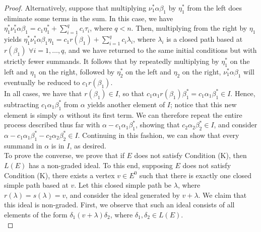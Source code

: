 \documentclass[12pt]{amsart}
\theoremstyle{plain} \numberwithin{equation}{section}
\theoremstyle{definition}
\theoremstyle{definition}
\begin{document}
\begin{proof}
Alternatively, suppose that multiplying $\nu_1^*\alpha\beta_1$ by $\eta_1^*$ from the left does eliminate some terms in the sum. In this case, we have $\eta_1^*\nu_1^*\alpha\beta_1 = c_1\eta_1^* + \sum_{i=1}^q c_i\tau_i$, where $q < n$. Then, multiplying from the right by $\eta_1$ yields $\eta_1^*\nu_1^*\alpha\beta_1\eta_1 = c_1r(\beta_1) + \sum_{i=1}^qc_i\lambda_i$, where $\lambda_i$ is a closed path based at $r(\beta_1)$ $\forall i = 1,\dots ,q$, and we have returned to the same initial conditions but with strictly fewer summands. It follows that by repeatedly multiplying by $\eta_1^*$ on the left and $\eta_1$ on the right, followed by $\eta_2^*$ on the left and $\eta_2$ on the right, $\nu_1^*\alpha\beta_1$ will eventually be reduced to $c_1r(\beta_1)$. \\

In all cases, we have that $r(\beta_1)\in I$, so that $c_1\alpha_1r(\beta_1)\beta_1^* = c_1\alpha_1\beta_1^*\in I$. Hence, subtracting $c_1\alpha_1\beta_1^*$ from $\alpha$ yields another element of $I$; notice that this new element is simply $\alpha$ without its first term. We can therefore repeat the entire process described thus far with $\alpha - c_1\alpha_1\beta_1^*$, showing that $c_2\alpha_2\beta_2^*\in I$, and consider $\alpha - c_1\alpha_1\beta_1^* - c_2\alpha_2\beta_2^*\in I$. Continuing in this fashion, we can show that every summand in $\alpha$ is in $I$, as desired.\\

To prove the converse, we prove that if $E$ does not satisfy Condition (K), then $L(E)$ has a non-graded ideal. To this end, supposing $E$ does not satisfy Condition (K), there exists a vertex $v\in E^0$ such that there is exactly one closed simple path based at $v$. Let this closed simple path be $\lambda$, where $r(\lambda) = s(\lambda) = v$, and consider the ideal generated by $v+\lambda$. We claim that this ideal is non-graded.
First, we observe that such an ideal consists of all elements of the form $\delta_1(v+\lambda)\delta_2$, where $\delta_1,\delta_2\in L(E)$. \\


\end{proof}
\end{document}
